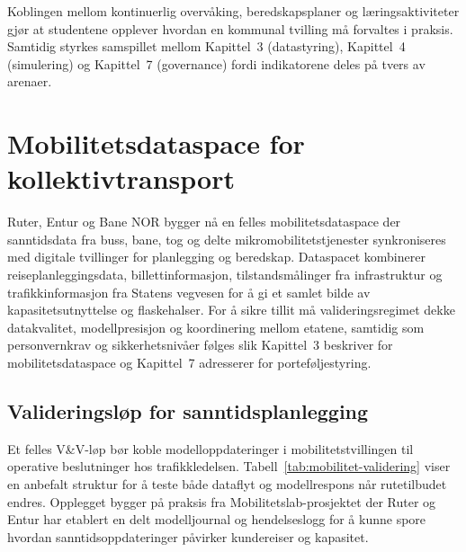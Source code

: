 Koblingen mellom kontinuerlig overvåking, beredskapsplaner og læringsaktiviteter gjør at studentene opplever hvordan en kommunal tvilling må forvaltes i praksis. Samtidig styrkes samspillet mellom Kapittel~3 (datastyring), Kapittel~4 (simulering) og Kapittel~7 (governance) fordi indikatorene deles på tvers av arenaer.

\section{Mobilitetsdataspace for kollektivtransport}
Ruter, Entur og Bane NOR bygger nå en felles mobilitetsdataspace der sanntidsdata fra buss, bane, tog og delte mikromobilitetstjenester synkroniseres med digitale tvillinger for planlegging og beredskap.\citep{ruter2024mobilitetslab,entur2023dataplattform,banenor2024digitalspor} Dataspacet kombinerer reiseplanleggingsdata, billettinformasjon, tilstandsmålinger fra infrastruktur og trafikkinformasjon fra Statens vegvesen for å gi et samlet bilde av kapasitetsutnyttelse og flaskehalser.\citep{vegvesen2023beredskap} For å sikre tillit må valideringsregimet dekke datakvalitet, modellpresisjon og koordinering mellom etatene, samtidig som personvernkrav og sikkerhetsnivåer følges slik Kapittel~3 beskriver for mobilitetsdataspace og Kapittel~7 adresserer for porteføljestyring.

\subsection{Valideringsløp for sanntidsplanlegging}
Et felles V\&V-løp bør koble modelloppdateringer i mobilitetstvillingen til operative beslutninger hos trafikkledelsen. Tabell~\ref{tab:mobilitet-validering} viser en anbefalt struktur for å teste både dataflyt og modellrespons når rutetilbudet endres. Opplegget bygger på praksis fra Mobilitetslab-prosjektet der Ruter og Entur har etablert en delt modelljournal og hendelseslogg for å kunne spore hvordan sanntidsoppdateringer påvirker kundereiser og kapasitet.\citep{ruter2024mobilitetslab,entur2023dataplattform}

